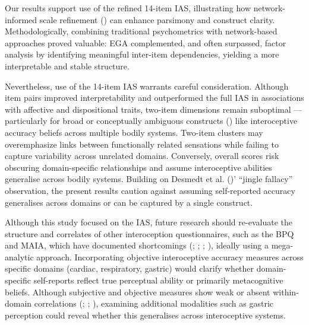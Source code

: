 \documentclass[
  jou,
  floatsintext,
  longtable,
  nolmodern,
  notxfonts,
  notimes,
  colorlinks=true,linkcolor=blue,citecolor=blue,urlcolor=blue]{apa7}
\begin{document}
Our results support use of the refined 14-item IAS, illustrating how
network-informed scale refinement
()
can enhance parsimony and construct clarity. Methodologically, combining
traditional psychometrics with network-based approaches proved valuable:
EGA complemented, and often surpassed, factor analysis by identifying
meaningful inter-item dependencies, yielding a more interpretable and
stable structure.

Nevertheless, use of the 14-item IAS warrants careful consideration.
Although item pairs improved interpretability and outperformed the full
IAS in associations with affective and dispositional traits, two-item
dimensions remain suboptimal --- particularly for broad or conceptually
ambiguous constructs () like interoceptive accuracy beliefs across multiple bodily
systems. Two-item clusters may overemphasize links between functionally
related sensations while failing to capture variability across unrelated
domains. Conversely, overall scores risk obscuring domain-specific
relationships and assume interoceptive abilities generalise across
bodily systems. Building on Desmedt et al.
()' ``jingle fallacy''
observation, the present results caution against assuming self-reported
accuracy generalises across domains or can be captured by a single
construct.

Although this study focused on the IAS, future research should
re-evaluate the structure and correlates of other interoception
questionnaires, such as the BPQ and MAIA, which have documented
shortcomings (;
;
;
), ideally using a
mega-analytic approach. Incorporating objective interoceptive accuracy
measures across specific domains (cardiac, respiratory, gastric) would
clarify whether domain-specific self-reports reflect true perceptual
ability or primarily metacognitive beliefs. Although subjective and
objective measures show weak or absent within-domain correlations
(;
;
), examining
additional modalities such as gastric perception could reveal whether
this generalises across interoceptive systems.
\end{document}
